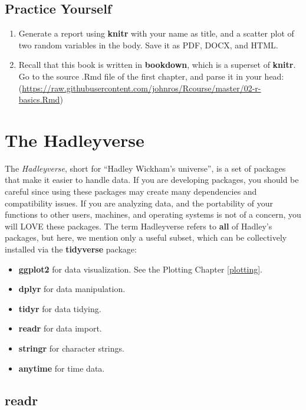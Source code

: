 \documentclass[]{book}
\providecommand{\tightlist}{%
  \setlength{\itemsep}{0pt}\setlength{\parskip}{0pt}}
\theoremstyle{definition}
\theoremstyle{definition}
\theoremstyle{definition}
\theoremstyle{remark}
\begin{document}
\section{Practice Yourself}\label{practice-yourself-9}

\begin{enumerate}
\def\labelenumi{\arabic{enumi}.}
\item
  Generate a report using \textbf{knitr} with your name as title, and a
  scatter plot of two random variables in the body. Save it as PDF,
  DOCX, and HTML.
\item
  Recall that this book is written in \textbf{bookdown}, which is a
  superset of \textbf{knitr}. Go to the source .Rmd file of the first
  chapter, and parse it in your head:
  (\url{https://raw.githubusercontent.com/johnros/Rcourse/master/02-r-basics.Rmd})
\end{enumerate}

\chapter{The Hadleyverse}\label{hadley}

The \emph{Hadleyverse}, short for ``Hadley Wickham's universe'', is a
set of packages that make it easier to handle data. If you are
developing packages, you should be careful since using these packages
may create many dependencies and compatibility issues. If you are
analyzing data, and the portability of your functions to other users,
machines, and operating systems is not of a concern, you will LOVE these
packages. The term Hadleyverse refers to \textbf{all} of Hadley's
packages, but here, we mention only a useful subset, which can be
collectively installed via the \textbf{tidyverse} package:

\begin{itemize}
\tightlist
\item
  \textbf{ggplot2} for data visualization. See the Plotting Chapter
  \ref{plotting}.
\item
  \textbf{dplyr} for data manipulation.
\item
  \textbf{tidyr} for data tidying.
\item
  \textbf{readr} for data import.
\item
  \textbf{stringr} for character strings.
\item
  \textbf{anytime} for time data.
\end{itemize}

\section{readr}\label{readr}
\end{document}

